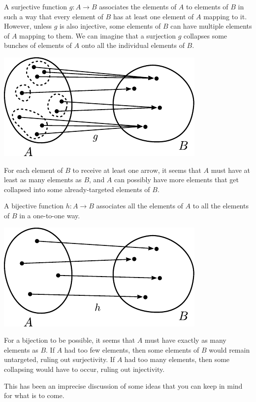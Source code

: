 \documentclass[12pt]{article}
\begin{document}
A surjective function $g:A\rightarrow B$ associates the elements of $A$ to elements of $B$ in such a way that 
every element of $B$ has at least one element of $A$ mapping to it.
However, unless $g$ is also injective, some elements of $B$ can have multiple elements of $A$ mapping to them.
We can imagine that a surjection $g$ collapses some bunches of elements of $A$ onto all the individual elements of $B$.
\begin{center}\includegraphics[scale=1]{img/collapse.pdf}\end{center}
For each element of $B$ to receive at least one arrow, it seems that $A$ must have at least as many elements as $B$,
and $A$ can possibly have more elements that get collapsed into some already-targeted elements of $B$.

A bijective function $h:A\rightarrow B$ associates all the elements of $A$ to all the elements of $B$ in a one-to-one way.
\begin{center}\includegraphics[scale=1]{img/collapse2.pdf}\end{center}
For a bijection to be possible, it seems that $A$ must have exactly as many elements as $B$.
If $A$ had too few elements, then some elements of $B$ would remain untargeted, ruling out surjectivity.
If $A$ had too many elements, then some collapsing would have to occur, ruling out injectivity.

This has been an imprecise discussion of some ideas that you can keep in mind for what is to come.
\end{document}
